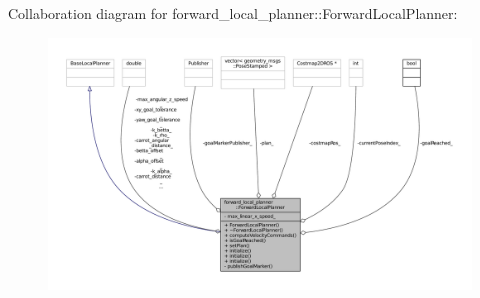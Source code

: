 Collaboration diagram for forward\+\_\+local\+\_\+planner\+:\+:Forward\+Local\+Planner\+:
\nopagebreak
\begin{figure}[H]
\begin{center}
\leavevmode
\includegraphics[width=350pt]{classforward__local__planner_1_1ForwardLocalPlanner__coll__graph}
\end{center}
\end{figure}

